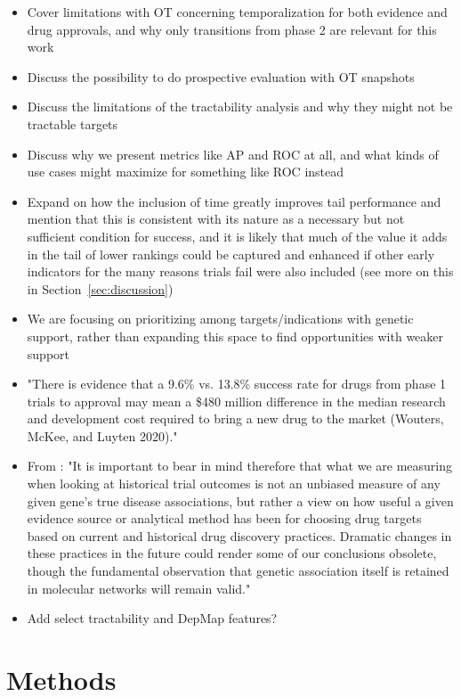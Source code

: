 \documentclass{article}
\begin{document}
\begin{itemize}
  \item Cover limitations with OT concerning temporalization for both evidence and drug approvals, and why only transitions from phase 2 are relevant for this work
  \item Discuss the possibility to do prospective evaluation with OT snapshots
  \item Discuss the limitations of the tractability analysis and why they might not be tractable targets
  \item Discuss why we present metrics like AP and ROC at all, and what kinds of use cases might maximize for something like ROC instead
  \item Expand on how the inclusion of time greatly improves tail performance and mention that this is consistent with its nature as a necessary but not sufficient condition for success, and it is likely that much of the value it adds in the tail of lower rankings could be captured and enhanced if other early indicators for the many reasons trials fail \cite{Razuvayevskaya2023.02.07.23285407} were also included (see more on this in Section~\ref{sec:discussion})
  \item We are focusing on prioritizing among targets/indications with genetic support, rather than expanding this space to find opportunities with weaker support
  \item "There is evidence that a 9.6\% vs. 13.8\% success rate for drugs from phase 1 trials to approval may mean a \$480 million difference in the median research and development cost required to bring a new drug to the market (Wouters, McKee, and Luyten 2020)." \cite{PMID:34930919}
  \item From \cite{PMID:33262371}: "It is important to bear in mind therefore that what we are measuring when looking at historical trial outcomes is not an unbiased measure of any given gene's true disease associations, but rather a view on how useful a given evidence source or analytical method has been for choosing drug targets based on current and historical drug discovery practices. Dramatic changes in these practices in the future could render some of our conclusions obsolete, though the fundamental observation that genetic association itself is retained in molecular networks will remain valid."
  \item Add select tractability and DepMap features?
\end{itemize}

\section{Methods}
\label{sec:methods}
\end{document}
